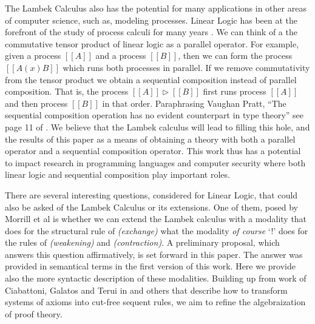 \documentclass{llncs}
\begin{document}
The Lambek Calculus also has the potential for many applications in
other areas of computer science, such as, modeling processes.  Linear
Logic has been at the forefront of the study of process calculi for
many years \cite{HONDA20102223,Pratt:1997,ABRAMSKY19945}. We can think
of a the commutative tensor product of linear logic as a parallel
operator.  For example, given a process $[[A]]$ and a process $[[B]]$,
then we can form the process $[[A (x) B]]$ which runs both processes
in parallel.  If we remove commutativity from the tensor product we
obtain a sequential composition instead of parallel composition.  That
is, the process $[[A]] \rhd [[B]]$ first runs process $[[A]]$ and then
process $[[B]]$ in that order.  Paraphrasing Vaughan Pratt, ``The
sequential composition operation has no evident counterpart in type
theory'' see page 11 of \cite{Pratt:1997}.  We believe that the Lambek
calculus will lead to filling this hole, and the results of this paper
as a means of obtaining a theory with both a parallel operator and a
sequential composition operator.  This work thus has a potential to
impact research in programming languages and computer security where
both linear logic and sequential composition play important roles.

There are several interesting questions, considered for Linear Logic,
that could also be asked of the Lambek Calculus or its extensions.
One of them, posed by Morrill et al is whether we can extend the
Lambek calculus with a modality that does for the structural rule of
\textit{(exchange)} what the modality \textit{of course} `!' does for
the rules of \textit{(weakening)} and \textit{(contraction)}.  A
preliminary proposal, which answers this question affirmatively, is
set forward in this paper. The answer was provided in semantical terms
in the first version of this work. Here we provide also the more
syntactic description of these modalities. Building up from work of
Ciabattoni, Galatos and Terui in \cite{Ciabattoni2012} and others that
describe how to transform systems of axioms into cut-free sequent
rules, we aim to refine the algebraization of proof theory.

\end{document}
